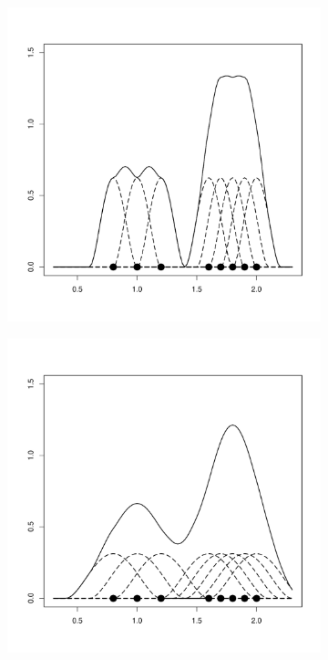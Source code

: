 \begin{figure}[H]
    \centering
    \begin{subfigure}[t]{0.32\textwidth}
        \includegraphics[width=\textwidth]{img/kernel1d-02}
        \label{fig:theory:kernel1d:02}
    \end{subfigure}
    \begin{subfigure}[t]{0.32\textwidth}
        \includegraphics[width=\textwidth]{img/kernel1d-04}

\end{subfigure}
\end{figure}
